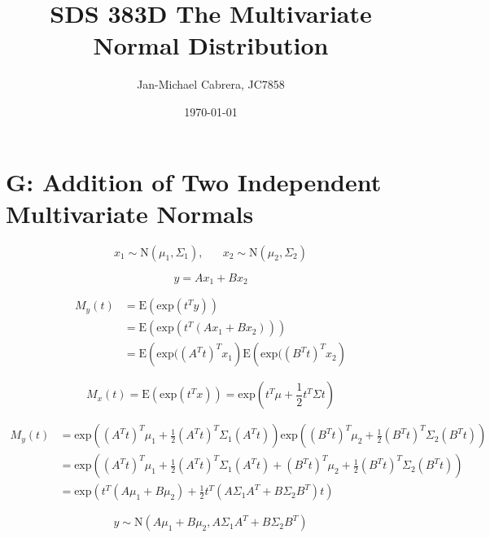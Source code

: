 \documentclass[12pt]{article}
\newcommand{\E}{\text{E}}
\begin{document}
    \title{SDS 383D The Multivariate Normal Distribution}
    \author{Jan-Michael Cabrera, JC7858}
    \date{\today}
    \maketitle

    \section*{G: Addition of Two Independent Multivariate Normals}

        \begin{equation}
            x_1 \sim \text{N}(\mu_1, \Sigma_1), \hspace{20pt} x_2 \sim \text{N}(\mu_2, \Sigma_2)
        \end{equation}

        \begin{equation}
            y = A x_1 + B x_2
        \end{equation}

        \begin{align}
            M_y(t) &= \E \left( \text{exp}( t^T y )\right) \\
            &= \E \left( \text{exp}( t^T (A x_1 + B x_2) )\right) \\
            &= \E \left( \text{exp}((A^Tt)^T x_1\right)\E \left( \text{exp}((B^Tt)^T x_2\right)
        \end{align}

        \begin{equation}
            M_x(t) = \E (\text{exp}(t^T x)) = \text{exp}\left(t^T \mu + \frac{1}{2} t^T \Sigma t \right)
        \end{equation}

        \begin{align}
            M_y(t) &= \text{exp}\left( (A^Tt)^T \mu_1 + \frac{1}{2} (A^Tt)^T \Sigma_1 (A^T t) \right)\text{exp}\left( (B^Tt)^T \mu_2 + \frac{1}{2} (B^Tt)^T \Sigma_2 (B^T t) \right) \\
            &= \text{exp}\left( (A^Tt)^T \mu_1 + \frac{1}{2} (A^Tt)^T \Sigma_1 (A^T t) + (B^Tt)^T \mu_2 + \frac{1}{2} (B^Tt)^T \Sigma_2 (B^T t) \right) \\
            &= \text{exp}\left( t^T (A \mu_1 + B \mu_2) + \frac{1}{2} t^T (A \Sigma_1 A^T + B \Sigma_2 B^T) t\right)
        \end{align}

        \begin{equation}
            y \sim \text{N}(A \mu_1 + B \mu_2, A \Sigma_1 A^T + B \Sigma_2 B^T)
        \end{equation}
\end{document}
